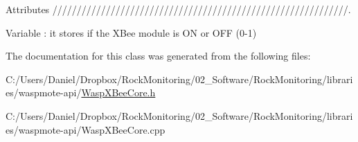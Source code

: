 Attributes /////////////////////////////////////////////////////////////. 

Variable \+: it stores if the X\+Bee module is ON or O\+FF (0-\/1) 

The documentation for this class was generated from the following files\+:\begin{DoxyCompactItemize}
\item 
C\+:/\+Users/\+Daniel/\+Dropbox/\+Rock\+Monitoring/02\+\_\+\+Software/\+Rock\+Monitoring/libraries/waspmote-\/api/\hyperlink{_wasp_x_bee_core_8h}{Wasp\+X\+Bee\+Core.\+h}\item 
C\+:/\+Users/\+Daniel/\+Dropbox/\+Rock\+Monitoring/02\+\_\+\+Software/\+Rock\+Monitoring/libraries/waspmote-\/api/Wasp\+X\+Bee\+Core.\+cpp\end{DoxyCompactItemize}
